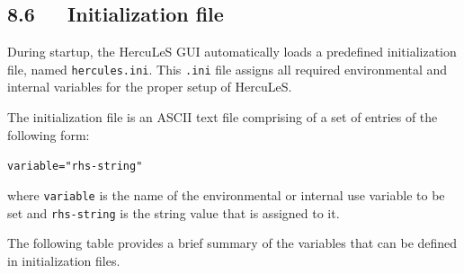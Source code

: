 \documentclass[a4paper]{article}
\newenvironment{DUlineblock}[1]{%
    \list{}{\setlength{\partopsep}{\parskip}
            \addtolength{\partopsep}{\baselineskip}
            \setlength{\topsep}{0pt}
            \setlength{\itemsep}{0.15\baselineskip}
            \setlength{\parsep}{0pt}
            \setlength{\leftmargin}{#1}}
    \raggedright
  }
  {\endlist}
\begin{document}
\subsection{8.6~~~Initialization file%
  \label{initialization-file}%
}

During startup, the HercuLeS GUI automatically loads a predefined initialization file, named \texttt{hercules.ini}. This \texttt{.ini} file assigns all required environmental and internal variables for the proper setup of HercuLeS.

The initialization file is an ASCII text file comprising of a set of entries of the following form:

\begin{DUlineblock}{0em}
\item[] \texttt{variable="rhs-string"}
\end{DUlineblock}

where \texttt{variable} is the name of the environmental or internal use variable to be set and \texttt{rhs-string} is the string value that is assigned to it.

The following table provides a brief summary of the variables that can be defined in initialization files.
\end{document}

